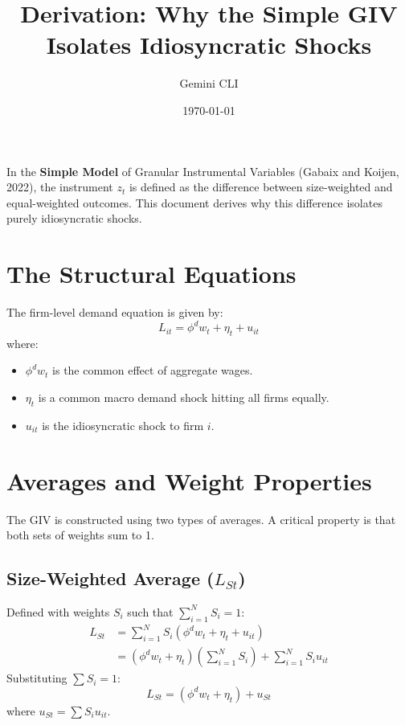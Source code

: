 \documentclass[11pt]{article}
\title{Derivation: Why the Simple GIV Isolates Idiosyncratic Shocks}
\author{Gemini CLI}
\date{\today}
\begin{document}
\maketitle

In the \textbf{Simple Model} of Granular Instrumental Variables (Gabaix and Koijen, 2022), the instrument $z_t$ is defined as the difference between size-weighted and equal-weighted outcomes. This document derives why this difference isolates purely idiosyncratic shocks.

\section{The Structural Equations}
The firm-level demand equation is given by:
\begin{equation}
    L_{it} = \phi^d w_t + \eta_t + u_{it}
\end{equation}
where:
\begin{itemize}
    \item $\phi^d w_t$ is the common effect of aggregate wages.
    \item $\eta_t$ is a common macro demand shock hitting all firms equally.
    \item $u_{it}$ is the idiosyncratic shock to firm $i$.
\end{itemize}

\section{Averages and Weight Properties}
The GIV is constructed using two types of averages. A critical property is that both sets of weights sum to 1.

\subsection{Size-Weighted Average ($L_{St}$)}
Defined with weights $S_i$ such that $\sum_{i=1}^N S_i = 1$:
\begin{align}
    L_{St} &= \sum_{i=1}^N S_i (\phi^d w_t + \eta_t + u_{it}) \\
    &= (\phi^d w_t + \eta_t) \left( \sum_{i=1}^N S_i \right) + \sum_{i=1}^N S_i u_{it}
\end{align}
Substituting $\sum S_i = 1$:
\begin{equation}
    L_{St} = (\phi^d w_t + \eta_t) + u_{St}
\end{equation}
where $u_{St} = \sum S_i u_{it}$.
\end{document}
